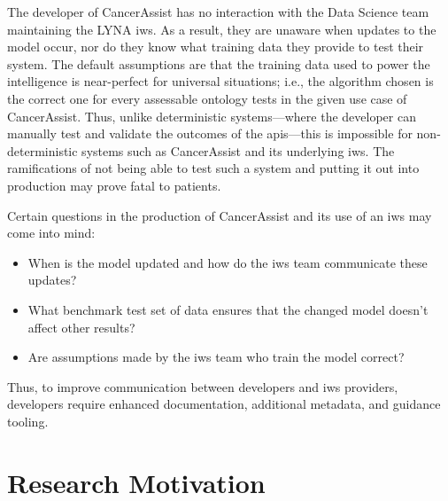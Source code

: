 The developer of CancerAssist has no interaction with the Data Science team maintaining the LYNA \gls{iws}. As a result, they are unaware when updates to the model occur, nor do they know what training data they provide to test their system. The default assumptions are that the training data used to power the intelligence is near-perfect for universal situations; i.e., the algorithm chosen is the correct one for every assessable ontology tests in the given use case of CancerAssist. Thus, unlike deterministic systems---where the developer can manually test and validate the outcomes of the \glspl{api}---this is impossible for non-deterministic systems such as CancerAssist and its underlying \gls{iws}. The ramifications of not being able to test such a system and putting it out into production may prove fatal to patients.

Certain questions in the production of CancerAssist and its use of an \gls{iws} may come into mind:

\begin{itemize}%
  \item When is the model updated and how do the \gls{iws} team communicate these updates?
  \item What benchmark test set of data ensures that the changed model doesn't affect other results?
  \item Are assumptions made by the \gls{iws} team who train the model correct?
\end{itemize}

Thus, to improve communication between developers and \gls{iws} providers, developers require enhanced documentation, additional metadata, and guidance tooling. 

\section{Research Motivation}%
\label{sec:introduction:motivation}

